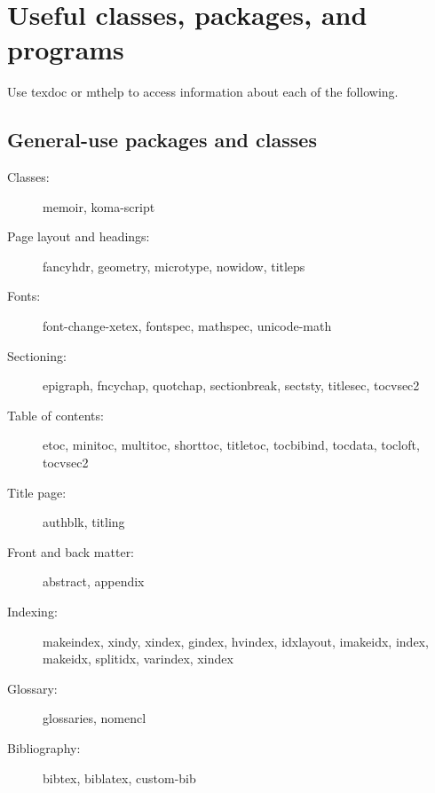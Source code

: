\documentclass{article}
\def\pkg#1{#1}%
\def\prog#1{\detokenize{#1}}%
\renewcommand*{\pkg}[1]{#1}
\renewcommand*{\prog}[1]{#1}
\begin{document}

\section{Useful classes, packages, and programs}

Use \prog{texdoc} or \prog{mthelp} to access information about each of the following.

\subsection{General-use packages and classes}

\begin{multicols}{2}

\begin{description}

\item[Classes:] \pkg{memoir}, \pkg{koma-script}

\item[Page layout and headings:] \pkg{fancyhdr}, \pkg{geometry}, \pkg{microtype},
    \pkg{nowidow}, \pkg{titleps}

\item[Fonts:] \pkg{font-change-xetex}, \pkg{fontspec}, \pkg{mathspec}, \pkg{unicode-math}

\item[Sectioning:] \pkg{epigraph}, \pkg{fncychap}, \pkg{quotchap},
    \pkg{sectionbreak}, \pkg{sectsty},
    \pkg{titlesec}, \pkg{tocvsec2}

\item[Table of contents:] \pkg{etoc}, \pkg{minitoc}, \pkg{multitoc}, \pkg{shorttoc},
    \pkg{titletoc}, \pkg{tocbibind}, \pkg{tocdata}, \pkg{tocloft}, \pkg{tocvsec2}

\item[Title page:] \pkg{authblk}, \pkg{titling}

\item[Front and back matter:] \pkg{abstract}, \pkg{appendix}

\item[Indexing:] \prog{makeindex}, \prog{xindy}, \prog{xindex}, \pkg{gindex},
    \pkg{hvindex}, \pkg{idxlayout}, \pkg{imakeidx}, \pkg{index}, \pkg{makeidx},
    \pkg{splitidx}, \pkg{varindex}, \pkg{xindex}

\item[Glossary:] \pkg{glossaries}, \pkg{nomencl}

\item[Bibliography:] \prog{bibtex}, \pkg{biblatex}, \prog{custom-bib}


\end{description}
\end{multicols}
\end{document}
